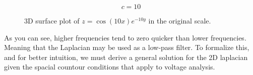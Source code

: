 \documentclass[12pt]{article}
\begin{document}
\[c=10\]
\begin{figure}[H]
\centering
{}
\caption{3D surface plot of $z = \cos(10x)e^{-10y}$ in the original scale.}
\label{fig:cos_exp_scaled}
\end{figure}

As you can see, higher frequencies tend to zero quicker than lower frequencies. Meaning that the Laplacian may be used as a low-pass filter. To formalize this, and for better intuition, we must derive a general solution for the 2D laplacian given the spacial countour conditions that apply to voltage analysis.
\end{document}
